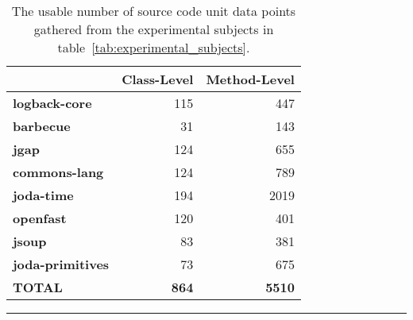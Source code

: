 \begin{landscape}
  \begin{table}[ht!]
    \centering
    \begin{threeparttable}
      \begin{tabular}{|l|r|r|}
        \rowcolor[RGB]{169,196,223}
        \hline & \textbf{Class-Level} & \textbf{Method-Level} \\
        \hline \cellcolor[RGB]{169,196,223} \textbf{logback-core} & 115 & 447 \\
        \hline \cellcolor[RGB]{169,196,223} \textbf{barbecue} & 31 & 143 \\
        \hline \cellcolor[RGB]{169,196,223} \textbf{jgap} & 124 & 655 \\
        \hline \cellcolor[RGB]{169,196,223} \textbf{commons-lang} & 124 & 789 \\
        \hline \cellcolor[RGB]{169,196,223} \textbf{joda-time} & 194 & 2019 \\
        \hline \cellcolor[RGB]{169,196,223} \textbf{openfast} & 120 & 401 \\
        \hline \cellcolor[RGB]{169,196,223} \textbf{jsoup} & 83 & 381 \\
        \hline \cellcolor[RGB]{169,196,223} \textbf{joda-primitives} & 73 & 675 \\
        \hline \cellcolor[RGB]{169,196,223} \textbf{TOTAL} & \textbf{864} & \textbf{5510} \\
        \hline
      \end{tabular}
    \end{threeparttable}
    \caption{The usable number of source code unit data points gathered from the experimental subjects in table~\ref{tab:experimental_subjects}.}
    \vspace{2mm}
    \hrule
    \label{tab:experiments_collected_data}
  \end{table}
\end{landscape}

